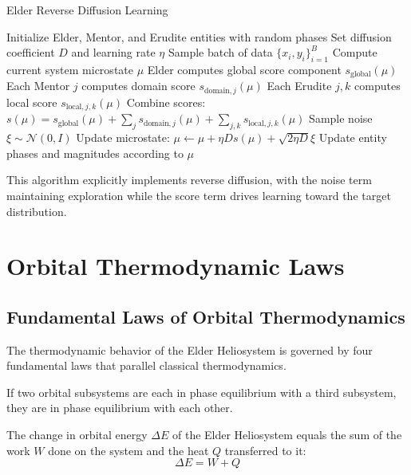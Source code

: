 \begin{algorithm}[h]
\caption{Elder Reverse Diffusion Learning}
\begin{algorithmic}[1]
\STATE Initialize Elder, Mentor, and Erudite entities with random phases
\STATE Set diffusion coefficient $D$ and learning rate $\eta$
\STATE Sample batch of data $\{x_i, y_i\}_{i=1}^B$
\STATE Compute current system microstate $\mu$
\STATE Elder computes global score component $s_{\text{global}}(\mu)$
\STATE Each Mentor $j$ computes domain score $s_{\text{domain},j}(\mu)$
\STATE Each Erudite $j,k$ computes local score $s_{\text{local},j,k}(\mu)$
\STATE Combine scores: $s(\mu) = s_{\text{global}}(\mu) + \sum_j s_{\text{domain},j}(\mu) + \sum_{j,k} s_{\text{local},j,k}(\mu)$
\STATE Sample noise $\xi \sim \mathcal{N}(0, I)$
\STATE Update microstate: $\mu \leftarrow \mu + \eta D s(\mu) + \sqrt{2\eta D} \xi$
\STATE Update entity phases and magnitudes according to $\mu$
\ENDWHILE
\end{algorithmic}
\end{algorithm}

This algorithm explicitly implements reverse diffusion, with the noise term maintaining exploration while the score term drives learning toward the target distribution.

\section{Orbital Thermodynamic Laws}

\subsection{Fundamental Laws of Orbital Thermodynamics}

The thermodynamic behavior of the Elder Heliosystem is governed by four fundamental laws that parallel classical thermodynamics.

\begin{theorem}
If two orbital subsystems are each in phase equilibrium with a third subsystem, they are in phase equilibrium with each other.
\end{theorem}

\begin{theorem}
The change in orbital energy $\Delta E$ of the Elder Heliosystem equals the sum of the work $W$ done on the system and the heat $Q$ transferred to it:
\begin{equation}
\Delta E = W + Q
\end{equation}
\end{theorem}

